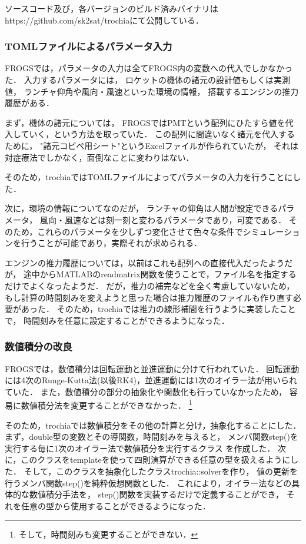 \documentclass[a4j,10pt]{jsarticle}
\begin{document}
ソースコード及び，各バージョンのビルド済みバイナリはhttps://github.com/sk2sat/trochiaにて公開している．

\subsubsection{TOMLファイルによるパラメータ入力}
FROGSでは，パラメータの入力は全てFROGS内の変数への代入でしかなかった．
入力するパラメータには，
ロケットの機体の諸元の設計値もしくは実測値，
ランチャ仰角や風向・風速といった環境の情報，
搭載するエンジンの推力履歴がある．

まず，機体の諸元については，
FROGSではPMTという配列にひたすら値を代入していく，という方法を取っていた．
この配列に間違いなく諸元を代入するために，
"諸元コピペ用シート"というExcelファイルが作られていたが，
それは対症療法でしかなく，面倒なことに変わりはない．

そのため，trochiaではTOMLファイルによってパラメータの入力を行うことにした．

次に，環境の情報についてなのだが，
ランチャの仰角は人間が設定できるパラメータ，
風向・風速などは刻一刻と変わるパラメータであり，可変である．
そのため，これらのパラメータを少しずつ変化させて色々な条件でシミュレーションを行うことが可能であり，実際それが求められる．

エンジンの推力履歴については，以前はこれも配列への直接代入だったようだが，
途中からMATLABのreadmatrix関数を使うことで，ファイル名を指定するだけでよくなったようだ．
だが，推力の補完などを全く考慮していないため，
もし計算の時間刻みを変えようと思った場合は推力履歴のファイルも作り直す必要があった．
そのため，trochiaでは推力の線形補間を行うように実装したことで，
時間刻みを任意に設定することができるようになった．

\subsubsection{数値積分の改良}

FROGSでは，数値積分は回転運動と並進運動に分けて行われていた．
回転運動には4次のRunge-Kutta法(以後RK4)，並進運動には1次のオイラー法が用いられていた．
また，数値積分の部分の抽象化や関数化も行っていなかったため，
容易に数値積分法を変更することができなかった．
\footnote{そして，時間刻みも変更することができない．}

そのため，trochiaでは数値積分をその他の計算と分け，抽象化することにした．
まず，double型の変数とその導関数，時間刻みを与えると，
メンバ関数step()を実行する毎に1次のオイラー法で数値積分を実行するクラス
を作成した．
次に，このクラスをtemplateを使って四則演算ができる任意の型を扱えるようにした．
そして，このクラスを抽象化したクラスtrochia::solverを作り，
値の更新を行うメンバ関数step()を純粋仮想関数とした．
これにより，オイラー法などの具体的な数値積分手法を，
step()関数を実装するだけで定義することができ，
それを任意の型から使用することができるようになった．
\end{document}
